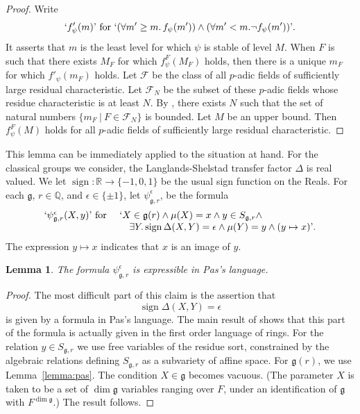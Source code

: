 \documentclass[11pt]{amsart}
\newtheorem{lemma}[theorem]{Lemma}
\theoremstyle{definition}
\theoremstyle{remark}
\numberwithin{equation}{theorem}
\def\calF{{\mathcal{F}}}
\def\tq{{\ \vert\ }}
\newcommand{\ring}[1]{\mathbb{#1}}
\def\lie#1{{\mathfrak{#1}}}
\def\sign{\operatorname{sign}}
\def\rq{\text{'}}
\begin{document}
\begin{proof}  Write
   \begin{equation}
   `f'_\psi(m)\rq \text{ for } `(\forall m' \ge m.\, f_\psi(m')) \wedge
      (\forall m' < m. \lnot f_\psi(m'))\rq.
   \end{equation}
It asserts that $m$ is the least level for which $\psi$ is stable
of level $M$.  When $F$ is such that there exists $M_F$ for which
$f^F_\psi(M_F)$ holds, then there is a unique $m_F$ for which
$f'_\psi(m_F)$ holds.  Let $\calF$ be the class of all $p$-adic
fields of sufficiently large residual characteristic.  Let
$\calF_N$ be the subset of these $p$-adic fields whose residue
characteristic is at least $N$.  By \cite[Thm.2]{HOI}, there
exists $N$ such that the set of natural numbers $\{m_F \tq
F\in\calF_N\}$ is bounded. Let $M$ be an upper bound. Then
$f^F_\psi(M)$ holds for all $p$-adic fields of sufficiently large
residual characteristic.
\end{proof}

This lemma can be immediately applied to the situation at hand.
For the classical groups we consider, the Langlands-Shelstad
transfer factor $\Delta$ is real valued.  We let
$\sign:\ring{R}\to \{-1,0,1\}$ be the usual sign function on the
Reals.   For each $\lie{g}$, $r\in\ring{Q}$, and
$\epsilon\in\{\pm1\}$, let $\psi_{\lie{g},r}^\epsilon$, be the
formula
   \begin{equation}
   \begin{array}{lll}
   `\psi_{\lie{g},r}^\epsilon(X,y)\rq \text{ for }&
   `X\in\lie{g}(r) \wedge \mu(X) = x \wedge y \in S_{\lie{g},r}
   \wedge\\
   &\quad \exists Y. \sign\Delta(X,Y) = \epsilon \wedge \mu(Y) = y \wedge
   (y\mapsto x)\rq.
   \end{array}
   \end{equation}
The expression $y\mapsto x$ indicates that $x$ is an image of $y$.

\begin{lemma}\label{lemma:psi-Pas}
The formula $\psi_{\lie{g},r}^\epsilon$ is expressible in Pas's
language.
\end{lemma}

\begin{proof}
The most difficult part of this claim is the assertion that
    $$
    \sign\Delta(X,Y)=\epsilon
    $$
is given by a formula in Pas's language. The main result of
\cite{VTF} shows that this part of the formula is actually given
in the first order language of rings. For the relation $y\in
S_{\lie{g},r}$ we use free variables of the residue sort,
constrained by the algebraic relations defining $S_{\lie{g},r}$ as
a subvariety of affine space.  For $\lie{g}(r)$, we use
Lemma~\ref{lemma:pas}.  The condition $X\in \lie{g}$ becomes
vacuous.  (The parameter $X$ is taken to be a set of $\dim\lie{g}$
variables ranging over $F$, under an identification of $\lie{g}$
with $F^{\dim\lie{g}}$.)  The result follows.
\end{proof}
\end{document}
